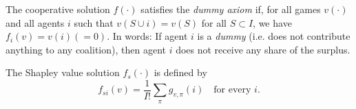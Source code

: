 \begin{defn}
    The cooperative solution $f(\cdot)$ satisfies the \emph{dummy axiom} if, for all games $v(\cdot)$ and all agents $i$ such that $v(S \cup {i}) = v(S)$ for all $S \subset I$, we have $f_i(v) = v(i) (=0)$. In words: If agent $i$ is a \emph{dummy} (i.e. does not contribute anything to any coalition), then agent $i$ does not receive any share of the surplus.
\end{defn}

\begin{defn}
    The Shapley value solution $f_s(\cdot)$ is defined by
    \begin{equation*}
        f_{si} (v) = \frac{1}{I!} \sum_\pi g_{v, \pi} (i) \quad \text{for every } i.
    \end{equation*}
\end{defn}

